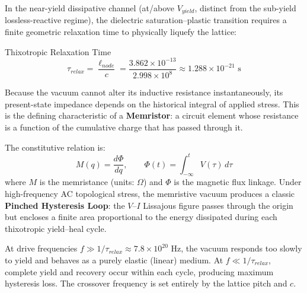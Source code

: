 In the near-yield dissipative channel (at/above $V_{yield}$, distinct from the sub-yield lossless-reactive regime), the dielectric saturation--plastic transition requires a finite geometric relaxation time to physically liquefy the lattice:
\begin{resultbox}{Thixotropic Relaxation Time}
\begin{equation}
    \tau_{relax} = \frac{\ell_{node}}{c} = \frac{3.862 \times 10^{-13}}{2.998 \times 10^{8}} \approx 1.288 \times 10^{-21} \text{ s}
    \label{eq:relaxation_time}
\end{equation}
\end{resultbox}

Because the vacuum cannot alter its inductive resistance instantaneously, its present-state impedance depends on the historical integral of applied stress. This is the defining characteristic of a \textbf{Memristor}: a circuit element whose resistance is a function of the cumulative charge that has passed through it.

The constitutive relation is:
\begin{equation}
    M(q) = \frac{d\Phi}{dq}, \qquad \Phi(t) = \int_{-\infty}^{t} V(\tau)\, d\tau
    \label{eq:memristor_constitutive}
\end{equation}
where $M$ is the memristance (units: $\Omega$) and $\Phi$ is the magnetic flux linkage. Under high-frequency AC topological stress, the memristive vacuum produces a classic \textbf{Pinched Hysteresis Loop}: the $V$--$I$ Lissajous figure passes through the origin but encloses a finite area proportional to the energy dissipated during each thixotropic yield--heal cycle.

At drive frequencies $f \gg 1/\tau_{relax} \approx 7.8 \times 10^{20}$ Hz, the vacuum responds too slowly to yield and behaves as a purely elastic (linear) medium. At $f \ll 1/\tau_{relax}$, complete yield and recovery occur within each cycle, producing maximum hysteresis loss. The crossover frequency is set entirely by the lattice pitch and $c$.

